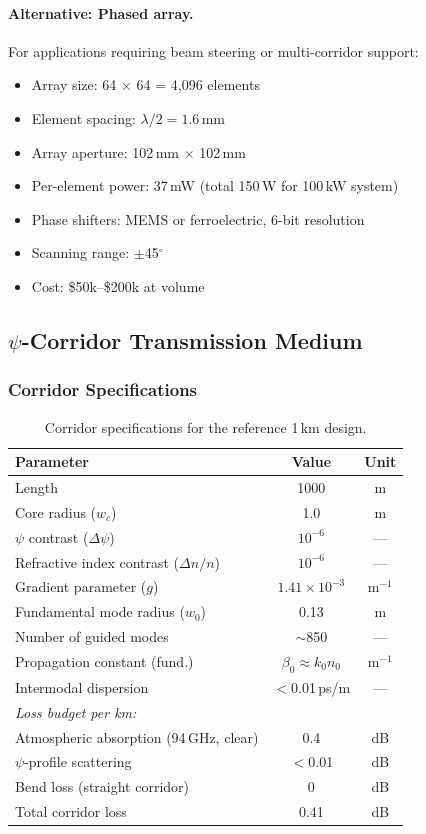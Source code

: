 \documentclass[11pt,a4paper]{article}
\begin{document}
\paragraph{Alternative: Phased array.}
For applications requiring beam steering or multi-corridor support:
\begin{itemize}
\item Array size: 64 $\times$ 64 = 4{,}096 elements
\item Element spacing: $\lambda/2 = 1.6$\,mm
\item Array aperture: 102\,mm $\times$ 102\,mm
\item Per-element power: 37\,mW (total 150\,W for 100\,kW system)
\item Phase shifters: MEMS or ferroelectric, 6-bit resolution
\item Scanning range: $\pm$45$^\circ$
\item Cost: \$50k--\$200k at volume
\end{itemize}

\subsection{$\psi$-Corridor Transmission Medium}

\subsubsection{Corridor Specifications}

\begin{table}[h]
\centering
\caption{Corridor specifications for the reference 1\,km design.}
\begin{tabular}{lcc}
\toprule
Parameter & Value & Unit \\
\midrule
Length & 1000 & m \\
Core radius ($w_c$) & 1.0 & m \\
$\psi$ contrast ($\Delta\psi$) & $10^{-6}$ & --- \\
Refractive index contrast ($\Delta n/n$) & $10^{-6}$ & --- \\
Gradient parameter ($g$) & $1.41 \times 10^{-3}$ & m$^{-1}$ \\
Fundamental mode radius ($w_0$) & 0.13 & m \\
Number of guided modes & $\sim$850 & --- \\
Propagation constant (fund.) & $\beta_0 \approx k_0 n_0$ & m$^{-1}$ \\
Intermodal dispersion & $<$0.01\,ps/m & --- \\
\midrule
\multicolumn{3}{l}{\textit{Loss budget per km:}} \\
Atmospheric absorption (94\,GHz, clear) & 0.4 & dB \\
$\psi$-profile scattering & $<$0.01 & dB \\
Bend loss (straight corridor) & 0 & dB \\
Total corridor loss & 0.41 & dB \\
\bottomrule
\end{tabular}
\end{table}
\end{document}
